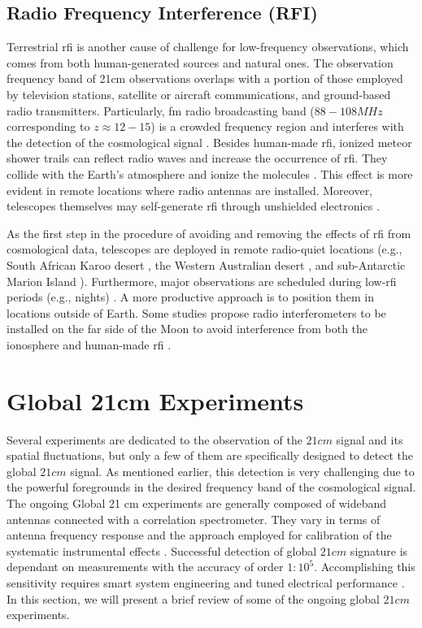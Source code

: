 \documentclass[12pt, TexShade, letterpaper]{report}
\begin{document}
\subsection{Radio Frequency Interference (RFI)}
Terrestrial \gls{rfi} is another cause of challenge for low-frequency observations, which comes from both human-generated sources and natural ones. The observation frequency band of 21cm observations overlaps with a portion of those employed by television stations, satellite or aircraft communications, and ground-based radio transmitters. Particularly, \gls{fm} radio broadcasting band ($88-108MHz$ corresponding to $z \approx 12-15$) is a crowded frequency region and interferes with the detection of the cosmological signal \cite{sci-hi_1}. 
Besides human-made \gls{rfi}, ionized meteor shower trails can reflect radio waves and increase the occurrence of \gls{rfi}. They collide with the Earth's atmosphere and ionize the molecules \cite{prizm_thesis}. This effect is more evident in remote locations where radio antennas are installed. Moreover, telescopes themselves may self-generate \gls{rfi} through unshielded electronics \cite{thesis_pamela}. \par
As the first step in the procedure of avoiding and removing the effects of \gls{rfi} from cosmological data, telescopes are deployed in remote radio-quiet locations (e.g., South African Karoo desert \cite{reach_design}, the Western Australian desert \cite{edges}, and sub-Antarctic Marion Island \cite{prizm_2017, prizm_thesis, rfi_1}). Furthermore, major observations are scheduled during low-\gls{rfi} periods (e.g., nights) \cite{leda_design}. A more productive approach is to position them in locations outside of Earth. Some studies propose radio interferometers to be installed on the far side of the Moon \cite{lunar_far_side, global_moon_far_side} to avoid interference from both the ionosphere and human-made \gls{rfi} \cite{thesis_pamela}. \par
\section{Global 21cm Experiments}
Several experiments are dedicated to the observation of the $21cm$ signal and its spatial fluctuations, but only a few of them are specifically designed to detect the global $21cm$ signal. As mentioned earlier, this detection is very challenging due to the powerful foregrounds in the desired frequency band of the cosmological signal. The ongoing Global 21 cm experiments are generally composed of wideband antennas connected with a correlation spectrometer. They vary in terms of antenna frequency response and the approach employed for calibration of the systematic instrumental effects \cite{hyperion_1}. Successful detection of global $21cm$ signature is dependant on measurements with the accuracy of order $1:10^5$. Accomplishing this sensitivity requires smart system engineering and tuned electrical performance \cite{hyperion_2}. In this section, we will present a brief review of some of the ongoing global $21cm$ experiments.\par
\end{document}
